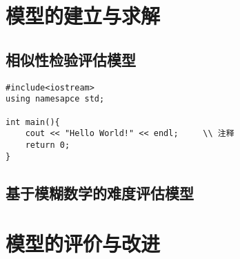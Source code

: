 \section{模型的建立与求解}

\subsection{相似性检验评估模型}



\begin{mgCodeBlock}
\end{mgCodeBlock}

\begin{mgCodeBlock}
\begin{verbatim}
#include<iostream>
using namesapce std;

int main(){
    cout << "Hello World!" << endl;     \\ 注释
    return 0;
}
\end{verbatim}
\end{mgCodeBlock}

\subsection{基于模糊数学的难度评估模型}

\subsection{}

\section{模型的评价与改进}

